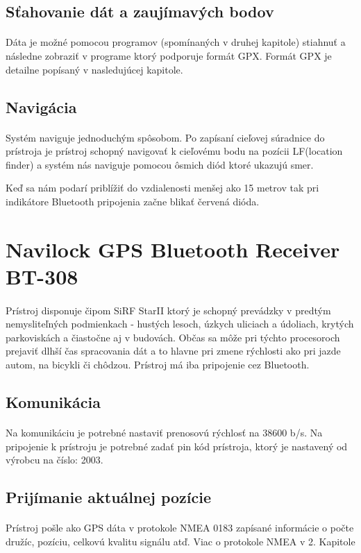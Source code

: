 \subsection{Sťahovanie dát a zaujímavých bodov}
\paragraph{}
Dáta je možné pomocou programov (spomínaných v druhej kapitole) stiahnuť a následne zobraziť v
programe ktorý podporuje formát GPX. Formát GPX je detailne popísaný v nasledujúcej kapitole.

\subsection{Navigácia}
\paragraph{}
Systém naviguje jednoduchým spôsobom. Po zapísaní cieľovej súradnice do
prístroja je prístroj schopný navigovať k cieľovému bodu na pozícii LF(location
finder) a systém nás naviguje pomocou ôsmich diód ktoré ukazujú smer. 

Keď sa nám podarí priblížiť do vzdialenosti menšej ako 15 metrov tak pri
indikátore Bluetooth pripojenia začne blikať červená dióda.

\section{Navilock GPS Bluetooth Receiver BT-308}
\paragraph{}
Prístroj disponuje čipom SiRF StarII ktorý je schopný prevádzky v predtým
nemysliteľných podmienkach - hustých lesoch, úzkych uliciach a údoliach, krytých
parkoviskách a čiastočne aj v budovách.
Občas sa môže pri týchto procesoroch prejaviť dlhší čas spracovania dát a to
hlavne pri zmene rýchlosti ako pri jazde autom, na bicykli či chôdzou.
Prístroj má iba pripojenie cez Bluetooth. 

\subsection{Komunikácia}
\paragraph{}
Na komunikáciu je potrebné nastaviť prenosovú rýchlosť na 38600 b/s. Na pripojenie k prístroju je potrebné zadať pin kód prístroja, ktorý je nastavený od výrobcu na číslo: 2003.

\subsection{Prijímanie aktuálnej pozície}
\paragraph{}
Prístroj pošle ako GPS dáta v protokole NMEA 0183 zapísané informácie o počte
družíc, pozíciu, celkovú kvalitu signálu atď. Viac o protokole NMEA v 2. Kapitole
